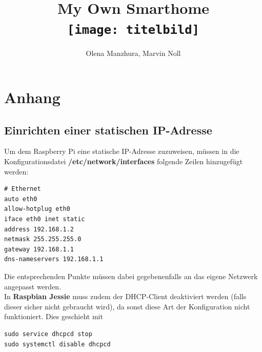 \documentclass[enabledeprecatedfontcommands,12pt,oneside,pdftex]{scrbook}
\begin{document}
\titlehead{IEH - 2017}
\subject{Bericht HiWi-Tätigkeit}
\title{My Own Smarthome \\[1cm] 
\texttt{[image: titelbild]} 
} 
\subtitle{}
\author{Olena Manzhura, Marvin Noll}
\publishers{betreut von Sebastian Hubschneider}

\maketitle

\clearpage
{}
\tableofcontents


\pagestyle{scrheadings}
\ohead{\pagemark}
\chead{}
\ihead{\headmark}
\ofoot{}
\cfoot{}
\ifoot{}






\appendix
\chapter{Anhang}
\section{Einrichten einer statischen IP-Adresse}
Um dem Raspberry Pi eine statische IP-Adresse zuzuweisen, müssen in die Konfigurationsdatei \textbf{/etc/network/interfaces} folgende Zeilen hinzugefügt werden:

\begin{verbatim}
# Ethernet
auto eth0
allow-hotplug eth0
iface eth0 inet static
address 192.168.1.2
netmask 255.255.255.0
gateway 192.168.1.1
dns-nameservers 192.168.1.1
\end{verbatim}
Die entsprechenden Punkte müssen dabei gegebenenfalls an das eigene Netzwerk angepasst werden.\\
In \textbf{Raspbian Jessie} muss zudem der DHCP-Client deaktiviert werden (falls dieser sicher nicht gebraucht wird), da sonst diese Art der Konfiguration nicht funktioniert. Dies geschieht mit 

\begin{verbatim}
sudo service dhcpcd stop
sudo systemctl disable dhcpcd
\end{verbatim}
\end{document}
